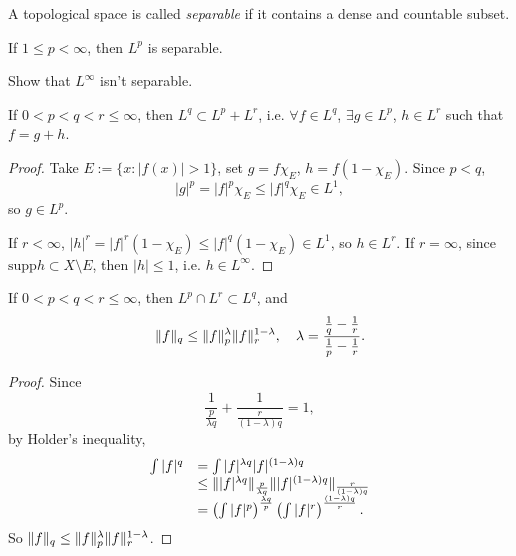 \begin{defn}[Separable]
    A topological space is called 
    \textit{separable} if it contains a 
    dense and countable subset.
\end{defn}
\begin{thm}
    If $1\le p<\infty$, then $L^{p}$ is separable.
\end{thm}
\begin{exc}
    Show that $L^{\infty}$ isn't separable.
\end{exc}
\begin{prop}
    \label{Prop:InterpolationIneq1}
    If $0<p<q<r\le\infty$, then $L^{q}\subset L^{p}+L^{r}$, i.e. 
    $\forall f\in L^{q}$, $\exists g\in L^{p}$, $h\in L^{r}$ 
    such that $f=g+h$.
\end{prop}
\begin{proof}
    Take $E:=\{x:|f(x)|>1\}$, set $g=f\chi_{E}$, $h=f(1-\chi_{E})$. 
    Since $p<q$, 
    \begin{displaymath}
        |g|^{p}=|f|^{p}\chi_{E}\le |f|^{q}\chi_{E}\in L^{1},
    \end{displaymath}
    so $g\in L^{p}$. 

    If $r<\infty$, $|h|^r=|f|^{r}(1-\chi_{E})\le|f|^{q}(1-\chi_{E})
    \in L^{1}$, so $h\in L^{r}$. 
    If $r=\infty$, since $\text{supp}h\subset X\setminus E$, 
    then $|h|\le 1$, i.e. $h\in L^{\infty}$.
\end{proof}
\begin{prop}
    \label{Prop:InterpolationIneq2}
    If $0<p<q<r\le\infty$, then $L^{p}\cap L^{r}\subset L^{q}$, 
    and 
    \begin{displaymath}
        \|f\|_{q}\le\|f\|_{p}^{\lambda}\|f\|_{r}^{1-\lambda},
        \quad
        \lambda=\frac{\frac{1}{q}-\frac{1}{r}}{\frac{1}{p}-\frac{1}{r}}.
    \end{displaymath}
\end{prop}
\begin{proof}
    Since 
    \begin{displaymath}
        \frac{1}{\frac{p}{\lambda q}}
        +\frac{1}{\frac{r}{(1-\lambda)q}}=1,
    \end{displaymath}
    by Holder's inequality, 
    \begin{displaymath}
        \begin{array}{rl}
            \int |f|^{q}&=\int|f|^{\lambda q}|f|^{(1-\lambda)q}\\
            &\le\||f|^{\lambda q}\|_{\frac{p}{\lambda q}}
            \||f|^{(1-\lambda)q}\|_{\frac{r}{(1-\lambda)q}}\\
            &=\left(\int|f|^{p}\right)^{\frac{\lambda q}{p}}
            \left(\int|f|^{r}\right)^{\frac{(1-\lambda)q}{r}}.
        \end{array}
    \end{displaymath}
    So $\|f\|_{q}\le\|f\|_{p}^{\lambda}\|f\|_{r}^{1-\lambda}$.
\end{proof}
